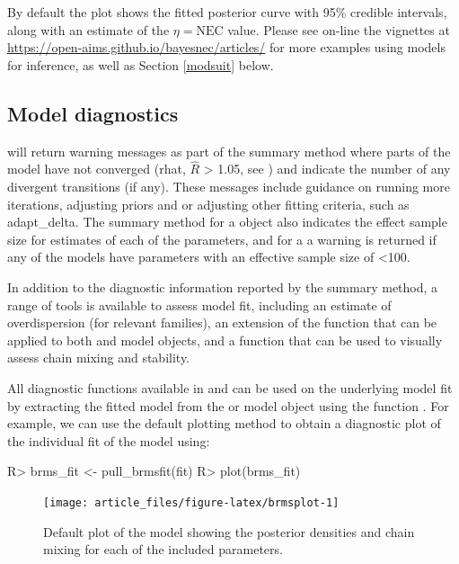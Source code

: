 \documentclass[
  shortnames]{jss}
\begin{document}
By default the plot shows the fitted posterior curve with 95\% credible intervals, along with an estimate of the \(\eta = \text{NEC}\) value. Please see on-line the vignettes at \url{https://open-aims.github.io/bayesnec/articles/} for more examples using  models for inference, as well as Section \ref{modsuit} below.

\subsection[Model diagnostics]{Model diagnostics}\label{moddiag}

 will return warning messages as part of the summary method where parts of the model have not converged (rhat, \(\widehat{R}\) \textgreater{} 1.05, see \citet{vehtari2021rank}) and indicate the number of any divergent transitions (if any). These messages include guidance on running more iterations, adjusting priors and or adjusting other fitting criteria, such as adapt\_delta. The summary method for a  object also indicates the effect sample size for estimates of each of the parameters, and for a  a warning is returned if any of the models have parameters with an effective sample size of \textless100.

In addition to the diagnostic information reported by the summary method, a range of tools is available to assess model fit, including an estimate of overdispersion (for relevant families), an extension of the   function that can be applied to both  and  model objects, and a function  that can be used to visually assess chain mixing and stability.

All diagnostic functions available in  and  can be used on the underlying  model fit by extracting the fitted  model from the  or  model object using the function . For example, we can use the default  plotting method to obtain a diagnostic plot of the individual fit of the  model using:

\begin{CodeChunk}
\begin{CodeInput}
R> brms_fit <- pull_brmsfit(fit)
R> plot(brms_fit)
\end{CodeInput}
\begin{figure}[!ht]

{\centering \texttt{[image: article\_files/figure-latex/brmsplot-1]} 

}

\caption[Default  plot of the  model showing the posterior densities and chain mixing for each of the included parameters]{Default  plot of the  model showing the posterior densities and chain mixing for each of the included parameters.}\label{fig:brmsplot}
\end{figure}
\end{CodeChunk}
\end{document}
